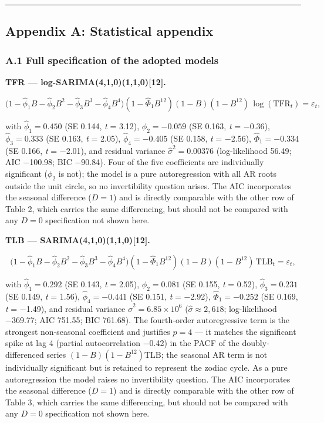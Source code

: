 \documentclass[
  11pt,
]{article}
\begin{document}
\begin{center}\rule{0.5\linewidth}{0.5pt}\end{center}

\subsection{Appendix A: Statistical
appendix}\label{appendix-a-statistical-appendix}

\subsubsection{A.1 Full specification of the adopted
models}\label{a.1-full-specification-of-the-adopted-models}

\textbf{TFR --- log-SARIMA(4,1,0)(1,1,0){[}12{]}.}

\[
\Big(1 - \hat{\phi}_1 B - \hat{\phi}_2 B^2 - \hat{\phi}_3 B^3 - \hat{\phi}_4 B^4\Big)(1 - \hat{\Phi}_1 B^{12})(1-B)(1-B^{12})\,\log(\text{TFR}_t) = \varepsilon_t,
\]

with \(\hat{\phi}_1 = 0.450\) (SE 0.144, \emph{t} = 3.12),
\(\hat{\phi}_2 = -0.059\) (SE 0.163, \emph{t} = −0.36),
\(\hat{\phi}_3 = 0.333\) (SE 0.163, \emph{t} = 2.05),
\(\hat{\phi}_4 = -0.405\) (SE 0.158, \emph{t} = −2.56),
\(\hat{\Phi}_1 = -0.334\) (SE 0.166, \emph{t} = −2.01), and residual
variance \(\hat\sigma^2 = 0.00376\) (log-likelihood 56.49; AIC −100.98;
BIC −90.84). Four of the five coefficients are individually significant
(\(\phi_2\) is not); the model is a pure autoregression with all AR
roots outside the unit circle, so no invertibility question arises. The
AIC incorporates the seasonal difference (\(D = 1\)) and is directly
comparable with the other row of Table 2, which carries the same
differencing, but should not be compared with any \(D = 0\)
specification not shown here.

\textbf{TLB --- SARIMA(4,1,0)(1,1,0){[}12{]}.}

\[
\Big(1 - \hat{\phi}_1 B - \hat{\phi}_2 B^2 - \hat{\phi}_3 B^3 - \hat{\phi}_4 B^4\Big)(1 - \hat{\Phi}_1 B^{12})(1-B)(1-B^{12})\,\text{TLB}_t = \varepsilon_t,
\]

with \(\hat{\phi}_1 = 0.292\) (SE 0.143, \emph{t} = 2.05),
\(\hat{\phi}_2 = 0.081\) (SE 0.155, \emph{t} = 0.52),
\(\hat{\phi}_3 = 0.231\) (SE 0.149, \emph{t} = 1.56),
\(\hat{\phi}_4 = -0.441\) (SE 0.151, \emph{t} = −2.92),
\(\hat{\Phi}_1 = -0.252\) (SE 0.169, \emph{t} = −1.49), and residual
variance \(\hat\sigma^2 = 6.85 \times 10^{6}\)
(\(\hat\sigma \approx 2{,}618\); log-likelihood −369.77; AIC 751.55; BIC
761.68). The fourth-order autoregressive term is the strongest
non-seasonal coefficient and justifies \(p = 4\) --- it matches the
significant spike at lag 4 (partial autocorrelation −0.42) in the PACF
of the doubly-differenced series \((1-B)(1-B^{12})\text{TLB}\); the
seasonal AR term is not individually significant but is retained to
represent the zodiac cycle. As a pure autoregression the model raises no
invertibility question. The AIC incorporates the seasonal difference
(\(D = 1\)) and is directly comparable with the other row of Table 3,
which carries the same differencing, but should not be compared with any
\(D = 0\) specification not shown here.
\end{document}
